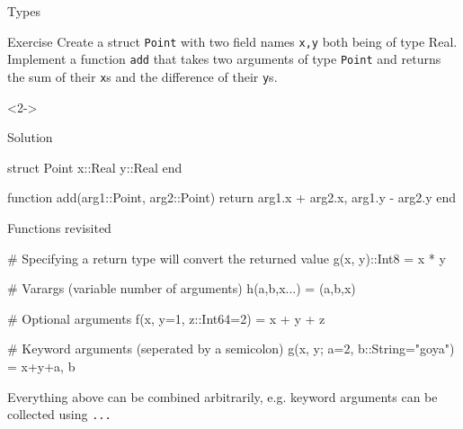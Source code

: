 \documentclass{beamer}
\newenvironment{Boxx}{\begin{tcolorbox}[standard jigsaw, opacityframe=0.8, opacityback=0.0]}{\end{tcolorbox}}
\begin{document}
\begin{frame}[fragile]{Types}
	\begin{overlayarea}{\linewidth}{9cm}
	\begin{block}{Exercise}
		Create a struct \verb|Point| with two field names \verb|x,y| both being of type Real. Implement a function \verb|add| that takes two arguments of type \verb|Point| and returns the sum of their \verb|x|s and the difference of their \verb|y|s.
	\end{block}
	\vfill
	\begin{onlyenv}<2->
	\begin{block}{Solution}
			\vspace*{1mm}
		\begin{jllisting}
  struct Point
    x::Real
    y::Real
  end
  
  function add(arg1::Point, arg2::Point)
    return arg1.x + arg2.x, arg1.y - arg2.y
  end
		\end{jllisting}
		\vspace*{1mm}
	\end{block}
\end{onlyenv}
\end{overlayarea}
\end{frame}

\begin{frame}[fragile]{Functions revisited}

	\begin{Boxx}
		\begin{jllisting}
  # Specifying a return type will convert the returned value	
  g(x, y)::Int8 = x * y
  
  # Varargs (variable number of arguments)
  h(a,b,x...) = (a,b,x)
  
  # Optional arguments
  f(x, y=1, z::Int64=2) = x + y + z
  
  # Keyword arguments (seperated by a semicolon)
  g(x, y; a=2, b::String="goya") = x+y+a, b
		\end{jllisting}
	\end{Boxx}
Everything above can be combined arbitrarily, e.g. keyword arguments can be collected using \verb|...|

	
\end{frame}
\end{document}
